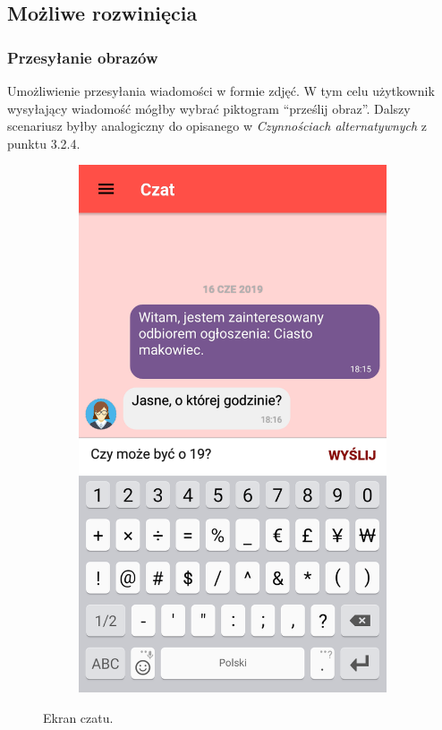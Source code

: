 \documentclass[licencjacka]{pracamgr}
\begin{document}
    \subsection{Możliwe rozwinięcia}
    \subsubsection{Przesyłanie obrazów}
    Umożliwienie przesyłania wiadomości w formie zdjęć. W tym celu użytkownik wysyłający wiadomość mógłby wybrać piktogram ``prześlij obraz''. Dalszy scenariusz byłby analogiczny do opisanego w \textit{Czynnościach alternatywnych} z punktu 3.2.4.

\newpage
\begin{figure}[H]
  \centering
  \begin{subfigure}[b]{0.4\linewidth}
    \begin{framed}
      \includegraphics[width=\linewidth]{czat.png}
    \end{framed}
  \end{subfigure}
  \caption{Ekran czatu.}
  \label{fig:chat}
\end{figure}
\end{document}
